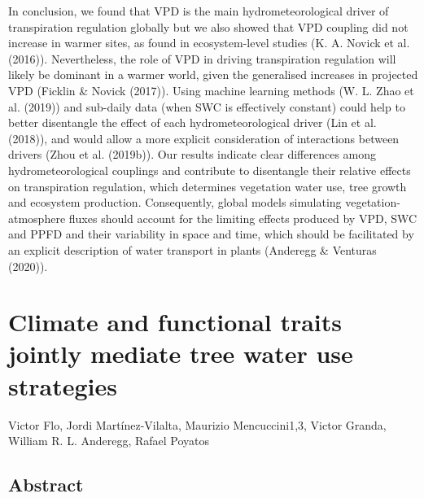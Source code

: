 \documentclass[11pt,twoside]{reedthesis}
\begin{document}
In conclusion, we found that VPD is the main hydrometeorological driver
of transpiration regulation globally but we also showed that VPD
coupling did not increase in warmer sites, as found in ecosystem-level
studies (K. A. Novick et al. (2016)). Nevertheless, the role of VPD in
driving transpiration regulation will likely be dominant in a warmer
world, given the generalised increases in projected VPD (Ficklin \&
Novick (2017)). Using machine learning methods (W. L. Zhao et al.
(2019)) and sub-daily data (when SWC is effectively constant) could help
to better disentangle the effect of each hydrometeorological driver (Lin
et al. (2018)), and would allow a more explicit consideration of
interactions between drivers (Zhou et al. (2019b)). Our results indicate
clear differences among hydrometeorological couplings and contribute to
disentangle their relative effects on transpiration regulation, which
determines vegetation water use, tree growth and ecosystem production.
Consequently, global models simulating vegetation-atmosphere fluxes
should account for the limiting effects produced by VPD, SWC and PPFD
and their variability in space and time, which should be facilitated by
an explicit description of water transport in plants (Anderegg \&
Venturas (2020)).\par

\newpage

\chapter[Climate and functional traits jointly mediate tree water use strategies]{Climate and functional traits jointly mediate tree water use strategies}

\setlength{\parindent}{0pt} Victor Flo, Jordi Martínez-Vilalta, Maurizio
Mencuccini1,3, Victor Granda, William R. L. Anderegg, Rafael Poyatos

\newpage

\setlength{\parindent}{30pt}

\section*{Abstract}
\end{document}
